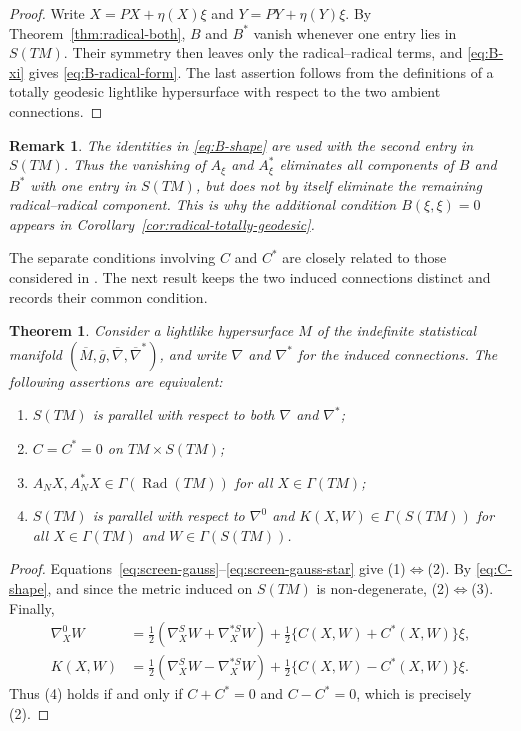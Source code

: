 \documentclass[10pt,a4paper]{amsart}
\newtheorem{theorem}{Theorem}[section]
\newtheorem*{remark}{Remark}
\newcommand{\Rad}{\operatorname{Rad}}
\begin{document}
\begin{proof}
Write $X=PX+\eta(X)\xi$ and $Y=PY+\eta(Y)\xi$. By
Theorem~\ref{thm:radical-both}, $B$ and $B^{*}$ vanish whenever one
entry lies in $S(TM)$. Their symmetry then leaves only the
radical--radical terms, and \eqref{eq:B-xi} gives
\eqref{eq:B-radical-form}. The last assertion
follows from the definitions of a totally geodesic lightlike hypersurface
with respect to the two ambient connections.
\end{proof}

\begin{remark}
The identities in \eqref{eq:B-shape} are used with the second entry in
$S(TM)$. Thus the vanishing of $A_{\xi}$ and $A_{\xi}^{*}$ eliminates all
components of $B$ and $B^{*}$ with one entry in $S(TM)$, but does not
by itself eliminate the remaining radical--radical component. This is why the additional condition
$B(\xi,\xi)=0$ appears in Corollary~\ref{cor:radical-totally-geodesic}.
\end{remark}

The separate conditions involving $C$ and $C^{*}$ are closely related to
those considered in \cite{RaniKaur2021,BahadirTripathi2023}. The next result keeps the
two induced connections distinct and records their common condition.

\begin{theorem}\label{thm:screen-both}
Consider a lightlike hypersurface $M$ of the indefinite statistical manifold
$(\overline{M},\overline{g},\overline{\nabla},\overline{\nabla}^{*})$, and
write $\nabla$ and $\nabla^{*}$ for the induced connections. The following
assertions are equivalent:
\begin{enumerate}
\item $S(TM)$ is parallel with respect to both $\nabla$ and
$\nabla^{*}$;
\item $C=C^{*}=0$ on $TM\times S(TM)$;
\item $A_NX,A_N^{*}X\in\Gamma(\Rad(TM))$ for all
$X\in\Gamma(TM)$;
\item $S(TM)$ is parallel with respect to $\nabla^{0}$ and
$K(X,W)\in\Gamma(S(TM))$ for all $X\in\Gamma(TM)$ and
$W\in\Gamma(S(TM))$.
\end{enumerate}
\end{theorem}

\begin{proof}
Equations~\eqref{eq:screen-gauss}--\eqref{eq:screen-gauss-star} give
(1)$\Leftrightarrow$(2). By \eqref{eq:C-shape}, and since the metric induced on $S(TM)$ is
non-degenerate, (2)$\Leftrightarrow$(3). Finally,
\begin{align}
\nabla_X^{0}W
&=\frac12(\nabla_X^{S}W+\nabla_X^{*S}W)
 +\frac12\{C(X,W)+C^{*}(X,W)\}\xi,\label{eq:nabla0-screen}\\
K(X,W)
&=\frac12(\nabla_X^{S}W-\nabla_X^{*S}W)
 +\frac12\{C(X,W)-C^{*}(X,W)\}\xi.\label{eq:K-screen}
\end{align}
Thus (4) holds if and only if $C+C^{*}=0$ and $C-C^{*}=0$, which is
precisely (2).
\end{proof}
\end{document}
